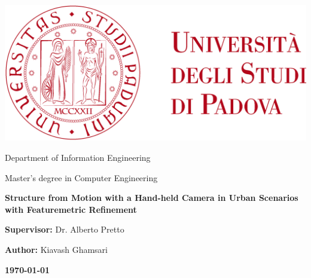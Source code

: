 \documentclass{article}
\date{\today}
\begin{document}
\begin{titlepage}
  \centering

  \includegraphics[width=1\textwidth]{images/unipd}

  \vspace{1cm}

  \LARGE Department of Information Engineering

  Master's degree in Computer Engineering

  \vspace{1cm}

  \LARGE\textbf{Structure from Motion with a Hand-held Camera in Urban Scenarios with Featuremetric Refinement}

  \vspace{1cm}

  \Large\textbf{Supervisor:} Dr. Alberto Pretto

  \textbf{Author:} Kiavash Ghamsari

  \vfill

  \vspace{1cm}

  \Large\textbf{\today}
\end{titlepage}
\end{document}
